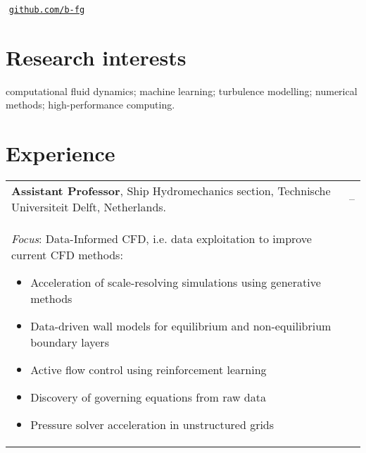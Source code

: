 \documentclass[line]{res}
\newenvironment{p1}
{\begin{adjustwidth}{-30pt}{0pt}
\vspace{8pt}}
{\end{adjustwidth}}
\newenvironment{p11}
{\begin{adjustwidth}{-25pt}{0pt}
\vspace{8pt}}
{\end{adjustwidth}}
\begin{document}



\begin{resume}
\section{}
\vspace{-15pt}
\\
\hspace*{0pt}\hfill\,\,\href{https://github.com/b-fg}{\texttt{github.com/b-fg}}\\
\vspace{-25pt}
\noindent

\section{Research interests}
\begin{p11}
computational fluid dynamics; machine learning; turbulence modelling; numerical methods; high-performance computing.
\end{p11}

\section{Experience}

\begin{p1}
\begin{tabular}{p{} >{\raggedleft\arraybackslash}p{}}
	\textbf{Assistant Professor}, Ship Hydromechanics section, Technische Universiteit Delft, Netherlands. & 2024--\\
	\textit{Focus}: Data-Informed CFD, i.e. data exploitation to improve current CFD methods:
	\begin{itemize}
		\item Acceleration of scale-resolving simulations using generative methods
		\item Data-driven wall models for equilibrium and non-equilibrium boundary layers
		\item Active flow control using reinforcement learning
		\item Discovery of governing equations from raw data
		\item Pressure solver acceleration in unstructured grids
	\end{itemize}
\end{tabular}


\end{p1}
\end{resume}
\end{document}

